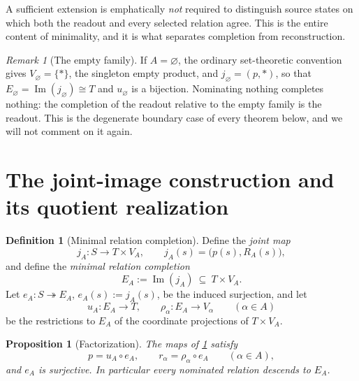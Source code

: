 \documentclass[11pt,reqno]{amsart}
\theoremstyle{plain}
\newtheorem{proposition}[theorem]{Proposition}
\theoremstyle{definition}
\newtheorem{definition}[theorem]{Definition}
\theoremstyle{remark}
\newtheorem{remark}[theorem]{Remark}
\numberwithin{equation}{section}
\DeclareMathOperator{\Image}{Im}
\begin{document}
A sufficient extension is emphatically \emph{not} required to distinguish source states on which
both the readout and every selected relation agree. This is the entire content of minimality, and it
is what separates completion from reconstruction.

\begin{remark}[The empty family]
\label{rem:empty}
If $A=\varnothing$, the ordinary set-theoretic convention gives $V_\varnothing=\{*\}$, the singleton
empty product, and $j_\varnothing=(p,\ast)$, so that
$E_\varnothing=\Image(j_\varnothing)\cong T$ and $u_\varnothing$ is a bijection. Nominating nothing
completes nothing: the completion of the readout relative to the empty family is the readout. This
is the degenerate boundary case of every theorem below, and we will not comment on it again.
\end{remark}

\section{The joint-image construction and its quotient realization}
\label{sec:construction}

\begin{definition}[Minimal relation completion]
\label{def:EA}
Define the \emph{joint map}
\begin{equation}
\label{eq:jA}
j_A\colon S\longrightarrow T\times V_A,
\qquad
j_A(s)=\bigl(p(s),R_A(s)\bigr),
\end{equation}
and define the \emph{minimal relation completion}
\begin{equation}
\label{eq:EA}
E_A:=\Image(j_A)\ \subseteq\ T\times V_A .
\end{equation}
Let $e_A\colon S\twoheadrightarrow E_A$, $e_A(s):=j_A(s)$, be the induced surjection, and let
\begin{equation}
\label{eq:structure-maps}
u_A\colon E_A\longrightarrow T,
\qquad
\rho_\alpha\colon E_A\longrightarrow V_\alpha
\qquad(\alpha\in A)
\end{equation}
be the restrictions to $E_A$ of the coordinate projections of $T\times V_A$.
\end{definition}

\begin{proposition}[Factorization]
\label{prop:factorization}
The maps of \cref{def:EA} satisfy
\begin{equation}
\label{eq:factorization}
p=u_A\circ e_A,
\qquad
r_\alpha=\rho_\alpha\circ e_A
\qquad(\alpha\in A),
\end{equation}
and $e_A$ is surjective. In particular every nominated relation descends to $E_A$.
\end{proposition}
\end{document}
